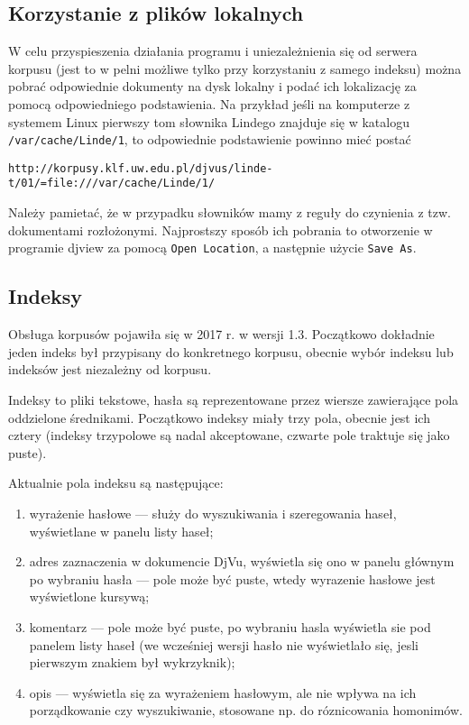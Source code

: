 \documentclass{mwart}
\begin{document}
\subsection{Korzystanie z plików lokalnych}
\label{sec:korzystanie-z-plikow}

W celu przyspieszenia działania programu i uniezależnienia się od
serwera korpusu (jest to w pelni możliwe tylko przy korzystaniu z
samego indeksu) można pobrać odpowiednie dokumenty na dysk lokalny i
podać ich lokalizację za pomocą odpowiedniego podstawienia. Na
przykład jeśli na komputerze z systemem Linux pierwszy tom słownika
Lindego znajduje się w katalogu \texttt{/var/cache/Linde/1}, to
odpowiednie podstawienie powinno mieć postać
\begin{verbatim}
http://korpusy.klf.uw.edu.pl/djvus/linde-t/01/=file:///var/cache/Linde/1/
\end{verbatim}

Należy pamietać, że w przypadku słowników mamy z reguły do czynienia z
tzw. dokumentami rozłożonymi. Najprostszy sposób ich pobrania to
otworzenie w programie \textsf{djview} za pomocą \texttt{Open
  Location}, a następnie użycie \texttt{Save As}.

\subsection{Indeksy}
\label{sec:indeksy} 

Obsługa korpusów pojawiła się w 2017 r. w wersji 1.3. Początkowo
dokładnie jeden indeks był przypisany do konkretnego korpusu, obecnie
wybór indeksu lub indeksów jest niezależny od korpusu.

Indeksy to pliki tekstowe, hasła są reprezentowane przez wiersze
zawierające pola oddzielone średnikami. Początkowo indeksy miały trzy
pola, obecnie jest ich cztery (indeksy trzypolowe są nadal
akceptowane, czwarte pole traktuje się jako puste).

Aktualnie pola indeksu są następujące:
\begin{enumerate}
\item wyrażenie hasłowe --- służy do wyszukiwania i szeregowania
  haseł, wyświetlane w panelu listy haseł;
\item adres zaznaczenia w dokumencie DjVu, wyświetla się ono w panelu
  głównym po wybraniu hasła --- pole może być puste, wtedy wyrazenie
  hasłowe jest wyświetlone kursywą;
\item komentarz --- pole może być puste, po wybraniu hasla wyświetla
  sie pod panelem listy haseł (we wcześniej wersji hasło nie
  wyświetlało się, jesli pierwszym znakiem był wykrzyknik);
\item opis --- wyświetla się za wyrażeniem hasłowym, ale nie wpływa na
  ich porządkowanie czy wyszukiwanie, stosowane np. do róznicowania
  homonimów.
\end{enumerate}
\end{document}

